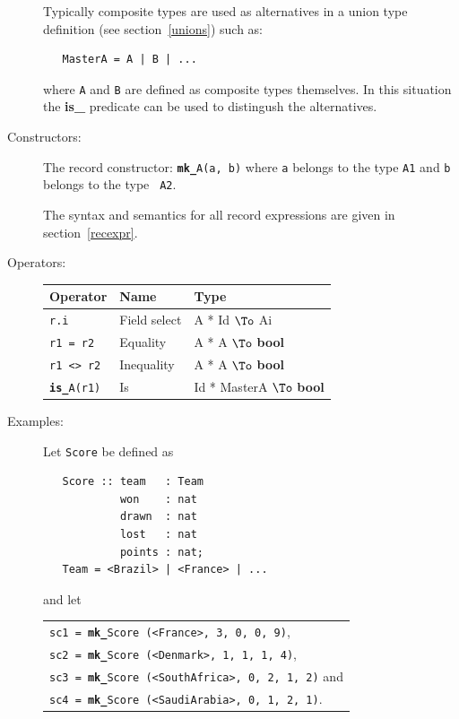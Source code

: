 \documentclass{overturerepchap}
\newcommand{\keyw}[1]{{\bf\ttfamily #1}}
\newcommand{\PROD}[2]{#1 * #2}
\newcommand{\TO}[2]{#1 $\To$ #2}
\begin{document}
\begin{description}
  Typically composite types are used as alternatives in a union type
  definition (see section~\ref{unions}) such as:

  \begin{lstlisting}
   MasterA = A | B | ...
  \end{lstlisting}
  where \texttt{A} and \texttt{B} are defined as composite types
  themselves. In this situation the \keyw{is\_} predicate can be used
  to distingush the alternatives.

\item[Constructors:] The record constructor: {\tt \keyw{mk\_}A(a, b)} where
  {\tt a} belongs to the type {\tt A1} and {\tt b} belongs to the type {\tt
    A2}.

  The syntax and semantics for all record expressions are given in
  section~\ref{recexpr}.%
\index{\keyw{mk\_}!record constructor}

\item[Operators:] \mbox{}

  \begin{tabular}{|l|l|l|} \hline
    Operator & Name & Type \\ \hline
    {\tt r.i} & Field select & \TO{\PROD{A}{Id}}{Ai} \\
    {\tt r1 = r2} & Equality & \TO{\PROD{A}{A}}{\keyw{bool}} \\
    {\tt r1 <> r2} & Inequality & \TO{\PROD{A}{A}}{\keyw{bool}} \\
    {\tt \keyw{is\_}A(r1)} & Is & \TO{\PROD{Id}{MasterA}}{\keyw{bool}} \\
    \hline
  \end{tabular}%
%



\item[Examples:] Let \texttt{Score} be defined as
\begin{lstlisting}
   Score :: team   : Team
            won    : nat
            drawn  : nat
            lost   : nat
            points : nat;
   Team = <Brazil> | <France> | ...
\end{lstlisting}
\label{scoredef}
and let 

\begin{tabular}{l}
\texttt{sc1 = \keyw{mk\_}Score (<France>, 3, 0, 0, 9)}, \\
\texttt{sc2 = \keyw{mk\_}Score (<Denmark>, 1, 1, 1, 4)},\\
\texttt{sc3 = \keyw{mk\_}Score (<SouthAfrica>, 0, 2, 1, 2)} and \\
\texttt{sc4 = \keyw{mk\_}Score (<SaudiArabia>, 0, 1, 2, 1)}.
\end{tabular}


\end{description}
\end{document}
